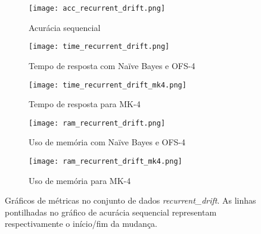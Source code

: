\begin{figure}[!htb]
\centering
\begin{subfigure}{0.5\textwidth}
\texttt{[image: acc\_recurrent\_drift.png]}
\caption{Acurácia sequencial} \label{fig:recurrent_1a}
\end{subfigure}
\hfill
\begin{minipage}[b]{\textwidth} 
\begin{subfigure}[t]{0.485\textwidth}
\texttt{[image: time\_recurrent\_drift.png]}
\caption{Tempo de resposta com Naïve Bayes e OFS-4} \label{fig:recurrent_1b}
\end{subfigure}
\hfil
\begin{subfigure}[t]{0.485\textwidth}
\texttt{[image: time\_recurrent\_drift\_mk4.png]}
\caption{Tempo de resposta para MK-4} \label{fig:recurrent_1c}
\end{subfigure}
\hfill
\begin{subfigure}[t]{0.485\textwidth}
\texttt{[image: ram\_recurrent\_drift.png]}
\caption{Uso de memória com Naïve Bayes e OFS-4} \label{fig:recurrent_1d}
\end{subfigure}
\hfill
\begin{subfigure}[t]{0.485\textwidth}
\texttt{[image: ram\_recurrent\_drift\_mk4.png]}
\caption{Uso de memória para MK-4} \label{fig:recurrent_1e}
\end{subfigure}
\end{minipage}

\caption[Gráficos de métricas no conjunto de dados \textit{recurrent\_drift}]{Gráficos de métricas no conjunto de dados \textit{recurrent\_drift}. As linhas pontilhadas no gráfico de acurácia sequencial representam respectivamente o início/fim da mudança. %
} \label{fig:recurrent_drift}
\end{figure}


